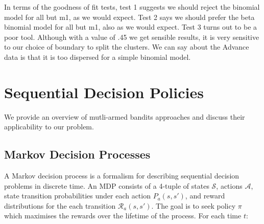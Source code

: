 \documentclass[11pt,a4,singlespacing,titlepagenumber=on]{scrreprt}
\numberwithin{equation}{chapter} %
\theoremstyle{remark}
\begin{document}
In terms of the goodness of fit tests, test 1 suggests we should reject the binomial model for all but m1, as we would expect.
Test 2 says we should prefer the beta binomial model for all but m1, also as we would expect. 
Test 3 turns out to be a poor tool. Although with a value of .45 we get sensible results, it is very sensitive to our choice of boundary to split the clusters.
We can say about the Advance data is that it is too dispersed for a simple binomial model.


%

\chapter{ Sequential Decision Policies }

We provide an overview of mutli-armed bandits approaches and discuss their applicability to our problem.

\section{ Markov Decision Processes }

A Markov decision process is a formalism for describing sequential decision problems in discrete time. An MDP consists of a 4-tuple of states $\mathcal{S}$, actions $\mathcal{A}$, state transition probabilities under each action $P_a(s,s')$, and reward distributions for the each transition $\mathcal{R}_a(s,s')$. The goal is to seek policy $\pi$ which maximises the rewards over the lifetime of the process. For each time $t$:
\end{document}
